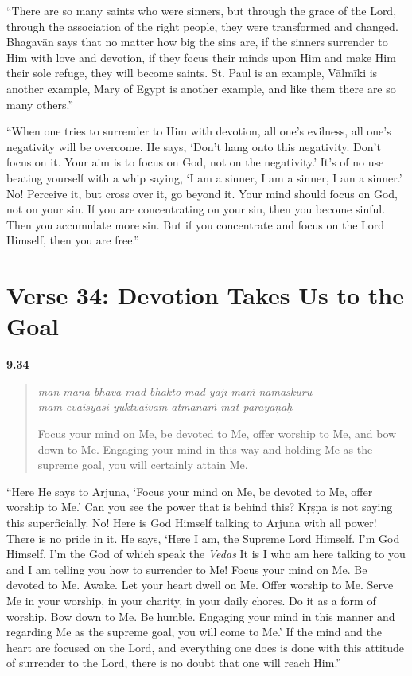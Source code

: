 \enquote{There are so many saints who were sinners, but through the grace of the Lord, through the association of the right people, they were transformed and changed. Bhagavān says that no matter how big the sins are, if the sinners surrender to Him with love and devotion, if they focus their minds upon Him and make Him their sole refuge, they will become saints. St. Paul is an example, Vālmīki is another example, Mary of Egypt is another example, and like them there are so many others.}

\enquote{When one tries to surrender to Him with devotion, all one’s evilness, all one’s negativity will be overcome. He says, \enquote{Don’t hang onto this negativity. Don’t focus on it. Your aim is to focus on God, not on the negativity.} It’s of no use beating yourself with a whip saying, \enquote{I am a sinner, I am a sinner, I am a sinner.} No! Perceive it, but cross over it, go beyond it. Your mind should focus on God, not on your sin. If you are concentrating on your sin, then you become sinful. Then you accumulate more sin. But if you concentrate and focus on the Lord Himself, then you are free.}



\section{Verse 34: Devotion Takes Us to the Goal}\label{sec-verse-34-devotion-takes-us-to-the-goal}




\par\noindent\textbf{9.34}\par
\begin{verse}
\textit{man-manā bhava mad-bhakto mad-yājī māṁ namaskuru} \\
\textit{mām evaiṣyasi yuktvaivam ātmānaṁ mat-parāyaṇaḥ}

\noindent Focus your mind on Me, be devoted to Me, offer worship to Me, and bow down to Me. Engaging your mind in this way and holding Me as the supreme goal, you will certainly attain Me.
\end{verse}
\par


\enquote{Here He says to Arjuna, \enquote{Focus your mind on Me, be devoted to Me, offer worship to Me.} Can you see the power that is behind this? Kṛṣṇa is not saying this superficially. No! Here is God Himself talking to Arjuna with all power! There is no pride in it. He says, \enquote{Here I am, the Supreme Lord Himself. I’m God Himself. I’m the God of which speak the \textit{Vedas} It is I who am here talking to you and I am telling you how to surrender to Me! Focus your mind on Me. Be devoted to Me. Awake. Let your heart dwell on Me. Offer worship to Me. Serve Me in your worship, in your charity, in your daily chores. Do it as a form of worship. Bow down to Me. Be humble. Engaging your mind in this manner and regarding Me as the supreme goal, you will come to Me.} If the mind and the heart are focused on the Lord, and everything one does is done with this attitude of surrender to the Lord, there is no doubt that one will reach Him.}
